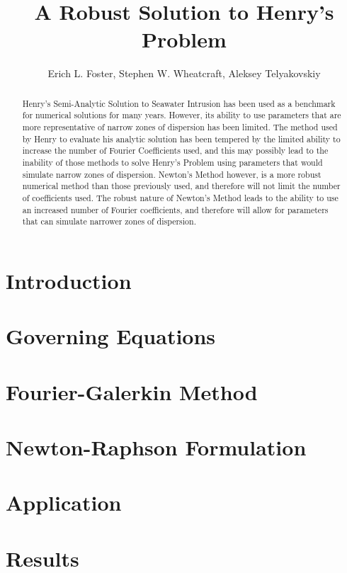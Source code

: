 \documentclass{article}
\title{A Robust Solution to Henry's Problem}
\author{Erich L. Foster, Stephen W. Wheatcraft, Aleksey Telyakovskiy}
\begin{document}
\maketitle

\begin{abstract}
Henry's Semi-Analytic Solution to Seawater Intrusion has been used as a 
benchmark for numerical solutions for many years. However, its ability to use 
parameters that are more representative of narrow zones of dispersion has been 
limited. The method used by Henry to evaluate his analytic solution has been 
tempered by the limited ability to increase the number of Fourier Coefficients 
used, and this may possibly lead to the inability of those methods to solve 
Henry's Problem using parameters that would simulate narrow zones of dispersion. 
Newton's Method however, is a more robust numerical method than those previously 
used, and therefore will not limit the number of coefficients used. The robust 
nature of Newton's Method leads to the ability to use an increased number of 
Fourier coefficients, and therefore will allow for parameters that can simulate 
narrower zones of dispersion.
\end{abstract}



\section{Introduction}


\section{Governing Equations}


\section{Fourier-Galerkin Method}


\section{Newton-Raphson Formulation}


\section{Application}


\section{Results}
\end{document}
